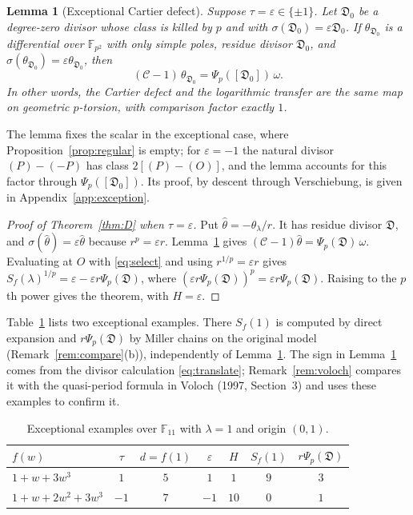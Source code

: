 \documentclass[11pt,a4paper]{article}
\numberwithin{equation}{section}
\theoremstyle{plain}
\newtheorem{lemma}[theorem]{Lemma}
\theoremstyle{definition}
\newcommand{\F}{\mathbb{F}}
\newcommand{\C}{\mathcal{C}}
\newcommand{\D}{\mathfrak{D}}
\newcommand{\eps}{\varepsilon}
\begin{document}
\begin{lemma}[Exceptional Cartier defect]\label{lem:exception}
Suppose $\tau=\eps\in\{\pm1\}$. Let $\D_0$ be a degree-zero divisor whose class is killed by $p$ and with $\sigma(\D_0)=\eps\D_0$. If $\theta_{\D_0}$ is a differential over $\F_{p^2}$ with only simple poles, residue divisor $\D_0$, and $\sigma(\theta_{\D_0})=\eps\theta_{\D_0}$, then
\begin{equation}\label{eq:defect}
(\C-1)\,\theta_{\D_0}=\Psi_p([\D_0])\,\omega .
\end{equation}
In other words, the Cartier defect and the logarithmic transfer are the same map on geometric $p$-torsion, with comparison factor exactly $1$.
\end{lemma}

The lemma fixes the scalar in the exceptional case, where Proposition~\ref{prop:regular} is empty; for $\eps=-1$ the natural divisor $(P)-(-P)$ has class $2[(P)-(O)]$, and the lemma accounts for this factor through $\Psi_p([\D_0])$. Its proof, by descent through Verschiebung, is given in Appendix~\ref{app:exception}.

\begin{proof}[Proof of Theorem~\ref{thm:D} when $\tau=\eps$]
Put $\widehat\theta=-\theta_\lambda/r$. It has residue divisor $\D$, and $\sigma(\widehat\theta)=\eps\widehat\theta$ because $r^p=\eps r$. Lemma~\ref{lem:exception} gives $(\C-1)\widehat\theta=\Psi_p(\D)\,\omega$. Evaluating at $O$ with \eqref{eq:select} and using $r^{1/p}=\eps r$ gives $S_f(\lambda)^{1/p}=\eps-\eps r\Psi_p(\D)$, where $(\eps r\Psi_p(\D))^p=\eps r\Psi_p(\D)$. Raising to the $p$th power gives the theorem, with $H=\eps$.
\end{proof}

Table~\ref{tab:exception} lists two exceptional examples. There $S_f(1)$ is computed by direct expansion and $r\Psi_p(\D)$ by Miller chains on the original model (Remark~\ref{rem:compare}(b)), independently of Lemma~\ref{lem:exception}. The sign in Lemma~\ref{lem:exception} comes from the divisor calculation \eqref{eq:translate}; Remark~\ref{rem:voloch} compares it with the quasi-period formula in Voloch (1997, Section~3) and uses these examples to confirm it.

\begin{table}[ht]
\centering
\caption{Exceptional examples over $\F_{11}$ with $\lambda=1$ and origin $(0,1)$.}\label{tab:exception}
\begin{tabular}{@{}lcccccc@{}}
\toprule
$f(w)$ & $\tau$ & $d=f(1)$ & $\eps$ & $H$ & $S_f(1)$ & $r\Psi_p(\D)$\\
\midrule
$1+w+3w^3$ & $1$ & $5$ & $1$ & $1$ & $9$ & $3$\\
$1+w+2w^2+3w^3$ & $-1$ & $7$ & $-1$ & $10$ & $0$ & $1$\\
\bottomrule
\end{tabular}
\end{table}
\end{document}
